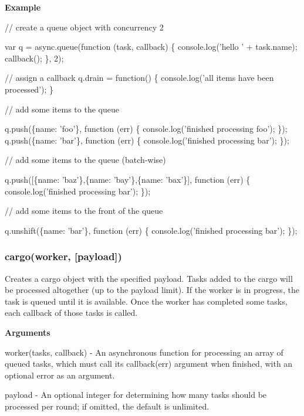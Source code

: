 {\bfseries Example}


\begin{DoxyCode}
\textcolor{comment}{// create a queue object with concurrency 2}

var q = async.queue(\textcolor{keyword}{function} (task, callback) \{
    console.log(\textcolor{stringliteral}{'hello '} + task.name);
    callback();
\}, 2);


\textcolor{comment}{// assign a callback}
q.drain = \textcolor{keyword}{function}() \{
    console.log(\textcolor{stringliteral}{'all items have been processed'});
\}

\textcolor{comment}{// add some items to the queue}

q.push(\{name: \textcolor{stringliteral}{'foo'}\}, \textcolor{keyword}{function} (err) \{
    console.log(\textcolor{stringliteral}{'finished processing foo'});
\});
q.push(\{name: \textcolor{stringliteral}{'bar'}\}, \textcolor{keyword}{function} (err) \{
    console.log(\textcolor{stringliteral}{'finished processing bar'});
\});

\textcolor{comment}{// add some items to the queue (batch-wise)}

q.push([\{name: \textcolor{stringliteral}{'baz'}\},\{name: \textcolor{stringliteral}{'bay'}\},\{name: \textcolor{stringliteral}{'bax'}\}], \textcolor{keyword}{function} (err) \{
    console.log(\textcolor{stringliteral}{'finished processing bar'});
\});

\textcolor{comment}{// add some items to the front of the queue}

q.unshift(\{name: \textcolor{stringliteral}{'bar'}\}, \textcolor{keyword}{function} (err) \{
    console.log(\textcolor{stringliteral}{'finished processing bar'});
\});
\end{DoxyCode}
 



\label{_cargo}%
 \subsubsection*{cargo(worker, \mbox{[}payload\mbox{]})}

Creates a cargo object with the specified payload. Tasks added to the cargo will be processed altogether (up to the payload limit). If the worker is in progress, the task is queued until it is available. Once the worker has completed some tasks, each callback of those tasks is called.

{\bfseries Arguments}


\begin{DoxyItemize}
\item worker(tasks, callback) -\/ An asynchronous function for processing an array of queued tasks, which must call its callback(err) argument when finished, with an optional error as an argument.
\item payload -\/ An optional integer for determining how many tasks should be processed per round; if omitted, the default is unlimited.
\end{DoxyItemize}

